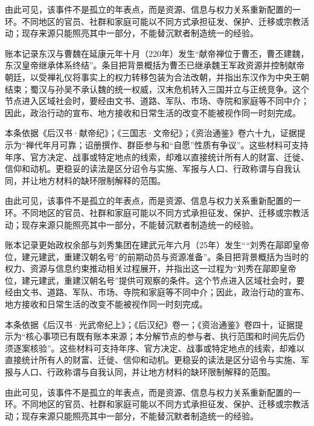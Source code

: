 由此可见，该事件不是孤立的年表点，而是资源、信息与权力关系重新配置的一环。不同地区的官员、社群和家庭可能以不同方式承担征发、保护、迁移或宗教活动；现存来源只能照亮其中一部分，不能替沉默者制造统一的经验。

账本记录东汉与曹魏在延康元年十月（220年）发生“献帝禅位于曹丕，曹丕建魏，东汉皇帝继承体系终结”。条目把背景概括为曹丕已继承魏王军政资源并控制献帝朝廷，以受禅礼仪将事实上的权力转移包装为合法改朝，并指出东汉作为中央王朝结束；蜀汉与孙吴不承认魏的统一权威，汉末危机转入三国并立与正统竞争。这个节点进入区域社会时，要经由文书、道路、军队、市场、寺院和家庭等不同中介；因此，政治行动的宣布、地方接收和日常生活的改变不能被视作同一时刻完成。

本条依据《后汉书·献帝纪》；《三国志·文帝纪》；《资治通鉴》卷六十九，证据提示为“禅代年月可靠；诏册撰作、群臣参与和“自愿”性质有争议”。这些材料可支持年序、官方决定、战事或特定地点的线索，却难以直接统计所有人的财富、迁徙、信仰和动机。更稳妥的读法是区分诏令与实施、军报与人口、行政称谓与自我认同，并让地方材料的缺环限制解释的范围。

由此可见，该事件不是孤立的年表点，而是资源、信息与权力关系重新配置的一环。不同地区的官员、社群和家庭可能以不同方式承担征发、保护、迁移或宗教活动；现存来源只能照亮其中一部分，不能替沉默者制造统一的经验。

账本记录更始政权余部与刘秀集团在建武元年六月（25年）发生““刘秀在鄗即皇帝位，建元建武，重建汉朝名号”的前期动员与资源准备”。条目把背景概括为当时的权力、资源与信息约束推动相关过程展开，并指出这一过程为“刘秀在鄗即皇帝位，建元建武，重建汉朝名号”提供可观察的条件。这个节点进入区域社会时，要经由文书、道路、军队、市场、寺院和家庭等不同中介；因此，政治行动的宣布、地方接收和日常生活的改变不能被视作同一时刻完成。

本条依据《后汉书·光武帝纪上》；《后汉纪》卷一；《资治通鉴》卷四十，证据提示为“核心事项已有既有账本来源；本分解节点的参与者、执行范围和时间先后仍须逐案核验”。这些材料可支持年序、官方决定、战事或特定地点的线索，却难以直接统计所有人的财富、迁徙、信仰和动机。更稳妥的读法是区分诏令与实施、军报与人口、行政称谓与自我认同，并让地方材料的缺环限制解释的范围。

由此可见，该事件不是孤立的年表点，而是资源、信息与权力关系重新配置的一环。不同地区的官员、社群和家庭可能以不同方式承担征发、保护、迁移或宗教活动；现存来源只能照亮其中一部分，不能替沉默者制造统一的经验。

